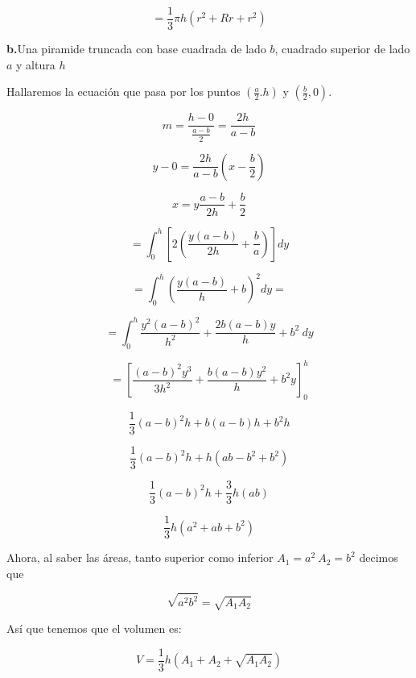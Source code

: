 \documentclass[12pt]{article}
\begin{document}
\begin{flushleft}
$$=\frac{1}{3}\pi h\left(r^{2}+Rr+r^{2}\right)$$


\textbf{b.}Una piramide truncada con base cuadrada de lado $b$, cuadrado superior de lado $a$ y altura $h$

Hallaremos la ecuación que pasa por los puntos $(\frac{a}{2}.h)$ y $(\frac{b}{2},0)$.

$$m=\frac{h-0}{\frac{a-b}{2}}=\frac{2h}{a-b}$$

$$y-0=\frac{2h}{a-b}\left(x-\frac{b}{2}\right)$$

$$x=y\frac{a-b}{2h}+\frac{b}{2}$$

$$=\int_{0}^{h}\left[2\left(\frac{y(a-b)}{2h}+\frac{b}{a}\right)\right]dy$$


$$=\int_{0}^{h}\left(\frac{y(a-b)}{h}+b\right)^{2}dy=$$


$$=\int_{0}^{h}\frac{y^{2}(a-b)^{2}}{h^{2}}+\frac{2b(a-b)y}{h}+b^{2}~dy$$


$$=\left [ \frac{(a-b)^{2}y^{3}}{3h^{2}} +\frac{b(a-b)y^{2}}{h}+b^{2}y\right ]_{0}^{h}$$


$$\frac{1}{3}(a-b)^{2}h+b(a-b)h+b^{2}h$$


$$\frac{1}{3}(a-b)^{2}h+h(ab-b^{2}+b^{2})$$


$$\frac{1}{3}(a-b)^{2}h+\frac{3}{3}h(ab)$$

$$\frac{1}{3}h(a^{2}+ab+b^{2})$$


Ahora, al saber las áreas, tanto superior como inferior $A_{1}=a^{2}~A_{2}=b^{2}$ decimos que 


$$\sqrt{a^{2}b^{2}}=\sqrt{A_{1}A_{2}}$$


Así que tenemos que el volumen es: 


$$V=\frac{1}{3}h(A_{1}+A_{2}+\sqrt{A_{1}A_{2}})$$







\end{flushleft}
\end{document}
